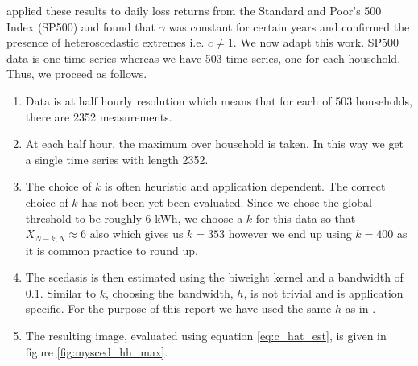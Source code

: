 
 \citet{einmahl16} applied these results to daily loss returns from the Standard and Poor's 500 Index (SP500) and found that $\gamma$ was constant for certain years and confirmed the presence of heteroscedastic extremes i.e. $c \neq 1$. We now adapt this work. SP500 data is one time series whereas we have 503 time series, one for each household. Thus, we proceed as follows.
\begin{enumerate}
\item Data is at half hourly resolution which means that for each of 503 households, there are 2352 measurements.
\item At each half hour, the maximum over household is taken. In this way we get a single time series with length 2352.
\item The choice of $k$ is often heuristic and application dependent. The correct choice of $k$ has not been yet been evaluated. Since we chose the global threshold to be roughly 6 kWh, we choose a $k$ for this data so that $X_{N-k,N} \approx 6$ also which gives us $k=353$ however we end up using $k=400$ as it is common practice to round up.
\item The scedasis is then estimated using the biweight kernel and a bandwidth of 0.1. Similar to $k$, choosing the bandwidth, $h$, is not trivial and is application specific. For the purpose of this report we have used the same $h$ as in \citet{einmahl16}.
\item The resulting image, evaluated using equation \ref{eq:c_hat_est}, is given in figure \ref{fig:mysced_hh_max}.
\end{enumerate}


